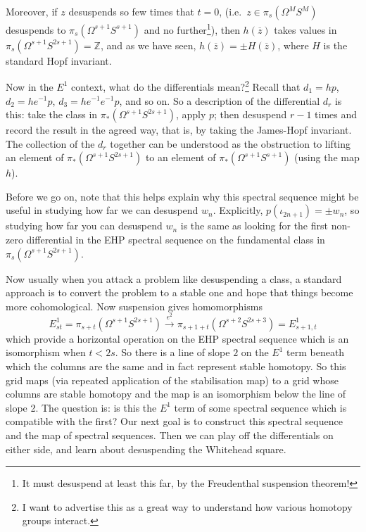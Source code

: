 \documentclass{article}
\newcommand{\Z}{\mathbb{Z}}
\newcommand{\Loops}{\Omega}
\begin{document}
\begin{enumerate}
Moreover, if $z$ desuspends so few times that $t=0$, (i.e.\ $z\in\pi_s(\Omega^M S^M)$ desuspends to $\pi_s(\Omega^{s+1} S^{s+1})$ and no further\footnote{It must desuspend at least this far, by the Freudenthal suspension theorem!}), then $h(\overline z)$ takes values in $\pi_{s}(\Omega^{s+1}S^{2s+1})=\Z$, and as we have seen, $h(\overline z)=\pm H(\overline z)$, where $H$ is the standard Hopf invariant.
\end{enumerate}



Now in the $E^1$ context, what do the differentials mean?\footnote{I want to advertise this as a great way to understand how various homotopy groups interact.}  Recall that $d_1 = hp$, $d_2 = he^{-1} p$, $d_3 = he^{-1} e^{-1} p$, and so on.  So a description of the differential $d_r$ is this: take the class in $\pi_* (\Loops^{s+1} S^{2s+1})$, apply $p$; then desuspend $r-1$ times and record the result in the agreed way, that is, by taking the James-Hopf invariant. The collection of the $d_r$ together can be understood as the obstruction to lifting an element of $\pi_*(\Loops^{s+1} S^{2s+1})$ to an element of $\pi_*(\Loops^{s+1} S^{s+1})$ (using the map $h$).

Before we go on, note that this helps explain why this spectral sequence might be useful in studying how far we can desuspend $w_n$. Explicitly, $p(\iota_{2n+1}) = \pm w_n$, so studying how far you can desuspend $w_n$ is the same as looking for the first non-zero differential in the EHP spectral sequence on the fundamental class in $\pi_s (\Loops^{s+1} S^{2s+1})$.

Now usually when you attack a problem like desuspending a class, a standard approach is to convert the problem to a stable one and hope that things become more cohomological.  Now suspension gives homomorphisms
\[E_{st}^1=\pi_{s+t}(\Omega^{s+1}S^{2s+1})\overset{e^2}{\longrightarrow}\pi_{s+1+t}(\Omega^{s+2}S^{2s+3})=E_{s+1,t}^1\]
which provide a horizontal operation on the EHP spectral sequence which is an isomorphism when $t<2s$.  So there is a line of slope $2$ on the $E^1$ term beneath which the columns are the same and in fact represent stable homotopy.  So this grid maps (via repeated application of the stabilisation map) to a grid whose columns are stable homotopy and the map is an isomorphism below the line of slope 2.  The question is: is this the $E^1$ term of some spectral sequence which is compatible with the first?  Our next goal is to construct this spectral sequence and the map of spectral sequences.  Then we can play off the differentials on either side, and learn about desuspending the Whitehead square.
\end{document}
